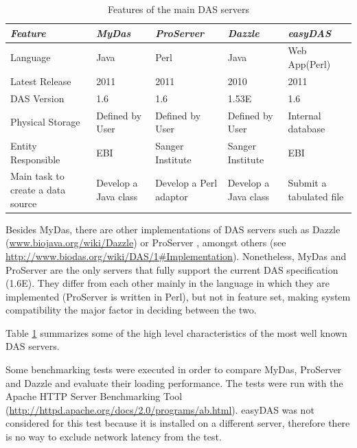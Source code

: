 \begin{table}[t]
        \begin{tabular}{|p{3cm}|p{2.7cm}|p{2.7cm}|p{2.7cm}|p{2.7cm}|}
\hline 
\emph{Feature} & \emph{MyDas} & \emph{ProServer} & \emph{Dazzle} & \emph{easyDAS}\\
\hline 
Language & Java & Perl & Java & Web App(Perl)\\
\hline 
Latest Release & 2011 & 2011 & 2010 & 2011\\
\hline 
DAS Version & 1.6 & 1.6 & 1.53E\footnotemark  & 1.6\\
\hline 
Physical Storage & Defined by User & Defined by User & Defined by User & Internal database\\
\hline 
Entity Responsible & EBI & Sanger Institute & Sanger Institute & EBI\\
\hline 
Main task to create a data source & Develop a Java class & Develop a Perl adaptor & Develop a Java class & Submit a tabulated file\\
\hline 
        \end{tabular}
        \caption{Features of the main DAS servers}
        \label{tab:table1}
\end{table}

Besides MyDas, there are other implementations of DAS servers such as Dazzle (\url{www.biojava.org/wiki/Dazzle}) or ProServer \cite{FIN2007},  amongst others (see \url{http://www.biodas.org/wiki/DAS/1#Implementation}). Nonetheless, MyDas and ProServer are the only servers that fully support the current DAS specification (1.6E). They differ from each other mainly in the language in which they are implemented (ProServer is written in Perl), but not in feature set, making system compatibility the major factor in deciding between the two.

Table \ref{tab:table1} summarizes some of the high level characteristics of the most well known DAS servers.


Some benchmarking tests were executed in order to compare  MyDas, ProServer and Dazzle and evaluate their loading performance. The tests were run with the Apache HTTP Server Benchmarking Tool (\url{http://httpd.apache.org/docs/2.0/programs/ab.html}).  easyDAS was not considered for this test because it is installed on a different server, therefore there is no way to exclude network latency from the test.

